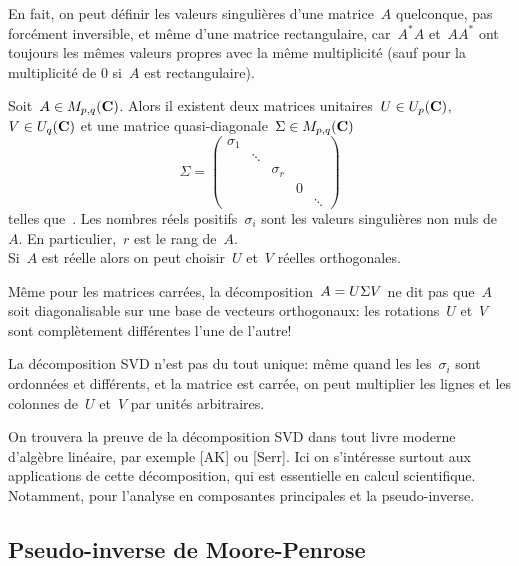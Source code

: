 En fait, on peut définir les valeurs singulières d'une matrice~$A$
quelconque, pas forcément inversible, et même d'une matrice rectangulaire,
car~$A^*A$ et~$AA^*$ ont toujours les mêmes valeurs propres avec la même
multiplicité (sauf pour la multiplicité de 0 si~$A$ est rectangulaire).

\begin{theorem}
	Soit~$A\in M_{p,q}(\mathbf{C})$.  Alors il existent deux matrices unitaires~$U\in
	U_p(\mathbf{C})$, $V\in U_q(\mathbf{C})$ et une matrice quasi-diagonale~$\Sigma\in
	M_{p,q}(\mathbf{C})$
	\[
		\Sigma = \begin{pmatrix}
			\sigma_1 & & & & \\
			 & \ddots & & & \\
			 & & \sigma_r & & \\
			 & & & 0 & \\
			 & & & & \ddots
		\end{pmatrix}
	\]
	telles que~.  Les nombres réels
	positifs~$\sigma_i$ sont les valeurs singulières non nuls de~$A$.  En
	particulier,~$r$ est le rang de~$A$. \\
	Si~$A$ est réelle alors on peut choisir~$U$ et~$V$ réelles orthogonales.
\end{theorem}

\begin{remark}
	Même pour les matrices carrées, la décomposition~$A=U\/\Sigma V$ ne dit pas
	que~$A$ soit diagonalisable sur une base de vecteurs orthogonaux: les
	rotations~$U$ et~$V$ sont complètement différentes l'une de l'autre!
\end{remark}

\begin{remark}
	La décomposition SVD n'est pas du tout unique: même quand les
	les~$\sigma_i$ sont ordonnées et différents, et la matrice est carrée, on
	peut multiplier les lignes et les colonnes de~$U$ et~$V$ par unités
	arbitraires.
\end{remark}

On trouvera la preuve de la décomposition SVD dans tout livre moderne d'algèbre
linéaire, par exemple [AK] ou [Serr].  Ici on s'intéresse surtout aux
applications de cette décomposition, qui est essentielle en calcul
scientifique.  Notamment, pour l'analyse en composantes principales et la
pseudo-inverse.


\subsection{Pseudo-inverse de Moore-Penrose}

